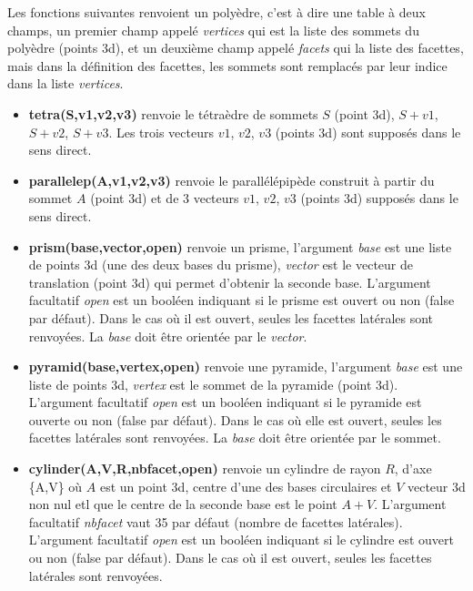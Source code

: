 \documentclass[%
10pt,%
a4paper,%
french,%
]%
{article}%
\begin{document}
Les fonctions suivantes renvoient un polyèdre, c'est à dire une table à deux champs, un premier champ appelé \emph{vertices} qui est la liste des sommets du polyèdre (points 3d), et un deuxième champ appelé \emph{facets} qui la liste des facettes, mais dans la définition des facettes, les sommets sont remplacés par leur indice dans la liste \emph{vertices}.

\begin{itemize}
    \item \textbf{tetra(S,v1,v2,v3)} renvoie le tétraèdre de sommets $S$ (point 3d), $S+v1$, $S+v2$, $S+v3$. Les trois vecteurs $v1$, $v2$, $v3$ (points 3d) sont supposés dans le sens direct.
    
    \item \textbf{parallelep(A,v1,v2,v3)} renvoie le parallélépipède construit à partir du sommet $A$ (point 3d) et de 3 vecteurs $v1$, $v2$, $v3$ (points 3d) supposés dans le sens direct.
    
    \item \textbf{prism(base,vector,open)} renvoie un prisme, l'argument \emph{base} est une liste de points 3d (une des deux bases du prisme), \emph{vector} est le vecteur de translation (point 3d) qui permet d'obtenir la seconde base. L'argument facultatif \emph{open} est un booléen indiquant si le prisme est ouvert ou non (false par défaut). Dans le cas où il est ouvert, seules les facettes latérales sont renvoyées. La \emph{base} doit être orientée par le \emph{vector}.
    
    \item \textbf{pyramid(base,vertex,open)} renvoie une pyramide, l'argument \emph{base} est une liste de points 3d, \emph{vertex} est le sommet de la pyramide (point 3d). L'argument facultatif \emph{open} est un booléen indiquant si le pyramide est ouverte ou non (false par défaut). Dans le cas où elle est ouvert, seules les facettes latérales sont renvoyées. La \emph{base} doit être orientée par le sommet.
    
    \item \textbf{cylinder(A,V,R,nbfacet,open)} renvoie un cylindre de rayon $R$, d'axe \{A,V\} où $A$ est un point 3d, centre d'une des bases circulaires et $V$ vecteur 3d non nul etl que le centre de la seconde base est le point $A+V$. L'argument facultatif \emph{nbfacet} vaut 35 par défaut (nombre de facettes latérales). L'argument facultatif \emph{open} est un booléen indiquant si le cylindre est ouvert ou non (false par défaut). Dans le cas où il est ouvert, seules les facettes latérales sont renvoyées.
    

\end{itemize}
\end{document}
